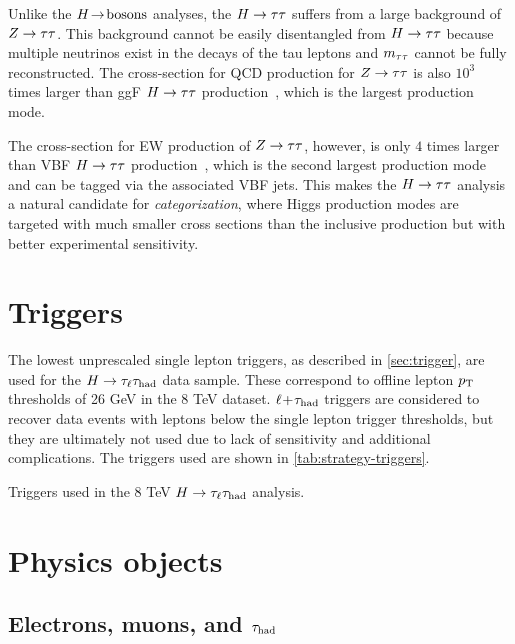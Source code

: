 Unlike the $H \!\rightarrow\! \text{bosons}$ analyses, the $H\rightarrow\tau\tau$ suffers from a large background of $Z\rightarrow\tau\tau$. This background cannot be easily disentangled from $H\rightarrow\tau\tau$ because multiple neutrinos exist in the decays of the tau leptons and $m_{\tau\tau}$ cannot be fully reconstructed. The cross-section for QCD production for $Z\rightarrow\tau\tau$ is also $10^3$ times larger than ggF $H\rightarrow\tau\tau$ production~\cite{HIGG-2013-32}, which is the largest production mode.

The cross-section for EW production of $Z\rightarrow\tau\tau$, however, is only $4$ times larger than VBF $H\rightarrow\tau\tau$ production~\cite{HIGG-2013-32}, which is the second largest production mode and can be tagged via the associated VBF jets. This makes the $H\rightarrow\tau\tau$ analysis a natural candidate for \textit{categorization}, where Higgs production modes are targeted with much smaller cross sections than the inclusive production but with better experimental sensitivity.

\section{Triggers}
\label{sec:strategy-triggers}

The lowest unprescaled single lepton triggers, as described in \cref{sec:trigger}, are used for the $H\rightarrow\tau_\ell\tau_\text{had}$ data sample. These correspond to offline lepton $p_{\mathrm{T}}$ thresholds of 26 GeV in the 8 TeV dataset. $\ell\!+\!\tau_\text{had}$ triggers are considered to recover data events with leptons below the single lepton trigger thresholds, but they are ultimately not used due to lack of sensitivity and additional complications. The triggers used are shown in \cref{tab:strategy-triggers}.

\begin{table}[bp]
  \centering
  \renewcommand{\arraystretch}{1.4}
  \caption{Triggers used in the 8 TeV $H\rightarrow\tau_\ell\tau_\text{had}$ analysis.}
  
  \label{tab:strategy-triggers}
\end{table}

\section{Physics objects}
\label{sec:strategy-objects}

\subsection{Electrons, muons, and $\tau_\text{had}$}
\label{sec:strategy-leptons}

